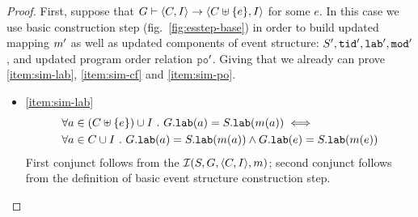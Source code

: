 \documentclass[12pt]{article}
\begin{document}
\begin{proof}
  

  First, suppose that 
  $G \vdash \langle C, I \rangle \rightarrow \langle C \uplus \{e\}, I \rangle$ for some $e$.
  In this case we use basic construction step (fig.~\ref{fig:esstep-base})
  in order to build updated mapping $m'$ as well as
  updated components of event structure: $S', {\mathtt{tid}}', {\mathtt{lab}}', {\mathtt{mod}}'$,
  and updated program order relation $\lPO'$.
  Giving that we already can prove
  \ref{item:sim-lab}, \ref{item:sim-cf} and \ref{item:sim-po}.

  \begin{itemize}
  \item \ref{item:sim-lab}
    \begin{equation}
      \begin{split}
        & \forall{a \in (C\uplus \{e\}) \cup I} ~.~ G.{\mathtt{lab}}(a) = S.{\mathtt{lab}}(m(a)) \iff \\
        & \forall{a \in C\cup I} ~.~ G.{\mathtt{lab}}(a) = S.{\mathtt{lab}}(m(a)) \wedge
        G.{\mathtt{lab}}(e) = S.{\mathtt{lab}}(m(e))
      \end{split}
    \end{equation}
    First conjunct follows from the $\mathcal{I}(S, G, \langle C, I \rangle, m)$;
    second conjunct follows from the definition of basic event structure construction step.


\end{itemize}
\end{proof}
\end{document}
